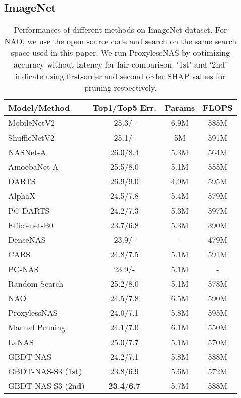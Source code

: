 \documentclass{article}
\begin{document}
\subsection{ImageNet}
\begin{table}[htbp]
\centering
\small
\begin{tabular}{lccc}
\toprule
Model/Method                      & Top1/Top5 Err. & Params & FLOPS \\ 
\midrule
MobileNetV2~\cite{mobilenetv2}     & 25.3/-        & 6.9M  & 585M \\
ShuffleNetV2~\cite{shufflenet}  & 25.1/-  &  5M & 591M  \\
\midrule
NASNet-A~\cite{nas}               & 26.0/8.4  & 5.3M      & 564M \\
AmoebaNet-A~\cite{amoebanet}      & 25.5/8.0  & 5.1M      & 555M \\
DARTS~\cite{darts}                & 26.9/9.0  & 4.9M      & 595M \\
AlphaX~\cite{mctsnas}            & 24.5/7.8  & 5.4M      & 579M\\
PC-DARTS~\cite{pcdarts}           & 24.2/7.3  & 5.3M      & 597M\\
Efficienet-B0~\cite{efficientnet} & 23.7/6.8 & 5.3M      & 390M \\
DenseNAS~\cite{densenas}          & 23.9/-   & -         & 479M \\
CARS~\cite{cars}                  & 24.8/7.5 & 5.1M      & 591M \\
PC-NAS~\cite{pcnas}               & 23.9/-   & 5.1M      & - \\
\midrule
Random Search                    & 25.2/8.0     & 5.1M   & 578M \\
NAO~\cite{nao}                   & 24.5/7.8     & 6.5M   & 590M \\
ProxylessNAS~\cite{proxylessnas}  & 24.0/7.1     & 5.8M   & 595M\\
Manual Pruning                  & 24.1/7.0     & 6.1M   & 550M \\
LaNAS~\cite{lanas}            & 25.0/7.7       & 5.1M   & 570M \\
\midrule 
GBDT-NAS                      & 24.2/7.1   & 5.8M      & 588M \\
GBDT-NAS-S3 (1st)   & 23.8/6.9   & 5.6M      & 572M \\
GBDT-NAS-S3 (2nd)  & \textbf{23.4}/\textbf{6.7} & 5.7M & 588M \\
\bottomrule
\end{tabular}
\caption{Performances of different methods on ImageNet dataset. For NAO, we use the open source code and search on the same search space used in this paper. We run ProxylessNAS by optimizing accuracy without latency for fair comparison. `1st' and `2nd' indicate using first-order and second order SHAP values for pruning respectively.}
\label{tbl:ImageNet}
\end{table}
\end{document}
